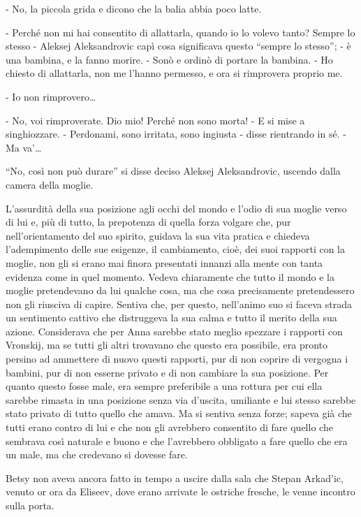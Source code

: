 - No, la piccola grida e dicono che la balia abbia poco latte. 

- Perché non mi hai consentito di allattarla, quando io lo volevo tanto? Sempre lo stesso - Aleksej Aleksandrovic capì cosa significava questo ``sempre lo stesso''; - è una bambina, e la fanno morire. - Sonò e ordinò di portare la bambina. - Ho chiesto di allattarla, non me l'hanno permesso, e ora si rimprovera proprio me. 

- Io non rimprovero\ldots{} 

- No, voi rimproverate. Dio mio! Perché non sono morta! - E si mise a singhiozzare. - Perdonami, sono irritata, sono ingiusta - disse rientrando in sé. - Ma va'\ldots{} 

``No, così non può durare'' si disse deciso Aleksej Aleksandrovic, uscendo dalla camera della moglie. 

L'assurdità della sua posizione agli occhi del mondo e l'odio di sua moglie verso di lui e, più di tutto, la prepotenza di quella forza volgare che, pur nell'orientamento del suo spirito, guidava la sua vita pratica e chiedeva l'adempimento delle sue esigenze, il cambiamento, cioè, dei suoi rapporti con la moglie, non gli si erano mai finora presentati innanzi alla mente con tanta evidenza come in quel momento. Vedeva chiaramente che tutto il mondo e la moglie pretendevano da lui qualche cosa, ma che cosa precisamente pretendessero non gli riusciva di capire. Sentiva che, per questo, nell'animo suo si faceva strada un sentimento cattivo che distruggeva la sua calma e tutto il merito della sua azione. Considerava che per Anna sarebbe stato meglio spezzare i rapporti con Vronskij, ma se tutti gli altri trovavano che questo era possibile, era pronto persino ad ammettere di nuovo questi rapporti, pur di non coprire di vergogna i bambini, pur di non esserne privato e di non cambiare la sua posizione. Per quanto questo fosse male, era sempre preferibile a una rottura per cui ella sarebbe rimasta in una posizione senza via d'uscita, umiliante e lui stesso sarebbe stato privato di tutto quello che amava. Ma si sentiva senza forze; sapeva già che tutti erano contro di lui e che non gli avrebbero consentito di fare quello che sembrava così naturale e buono e che l'avrebbero obbligato a fare quello che era un male, ma che credevano si dovesse fare. 

\label{xxi-3} 

Betsy non aveva ancora fatto in tempo a uscire dalla sala che Stepan Arkad'ic, venuto or ora da Eliseev, dove erano arrivate le ostriche fresche, le venne incontro sulla porta. 

